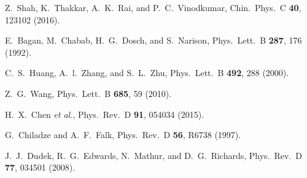 \documentclass[showkeys,aps,twocolumn,showpacs,preprintnumbers,amsmath,amssymb,prd,letterpaper,floatfix,nofootinbib,superscriptaddress,]{revtex4-1}
\begin{document}
{\begin{thebibliography}{99}
  Z.~Shah, K.~Thakkar, A.~K.~Rai, and P.~C.~Vinodkumar,
  Chin.\ Phys.\ C {\bf 40}, 123102 (2016).


 E.~Bagan, M.~Chabab, H.~G.~Dosch, and S.~Narison,
Phys.\ Lett.\ B \textbf{287}, 176 (1992).

 C.~S.~Huang, A.~l.~Zhang, and S.~L.~Zhu,
Phys.\ Lett.\ B \textbf{492}, 288 (2000).


 Z.~G.~Wang,
Phys.\ Lett.\ B \textbf{685}, 59 (2010).


 H.~X.~Chen {\it et al.}, 
Phys.\ Rev.\ D \textbf{91}, 054034 (2015).



 G.~Chiladze and A.~F.~Falk,
Phys.\ Rev.\ D \textbf{56}, R6738 (1997).


  J.~J.~Dudek, R.~G.~Edwards, N.~Mathur, and D.~G.~Richards,
  Phys.\ Rev.\ D {\bf 77}, 034501 (2008).


\end{thebibliography}}
\end{document}
